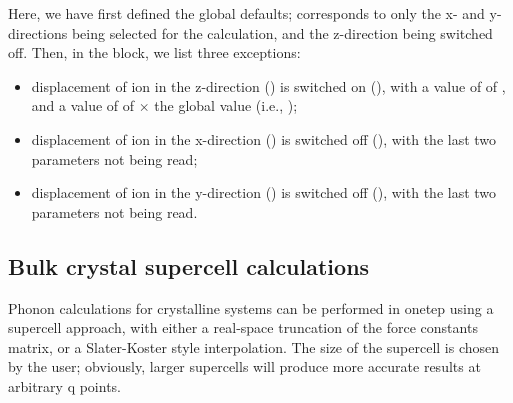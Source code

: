 \documentclass[letterpaper,10pt,english]{sphinxmanual}
\begin{document}
%
\begin{sphinxVerbatim}[commandchars=\\\{\}]
 
 
  

 
    
    
    
 
\end{sphinxVerbatim}

Here, we have first defined the global defaults; 
corresponds to only the x- and y-directions being selected for the
calculation, and the z-direction being switched off. Then, in the
 block, we list three exceptions:
\begin{itemize}
\item {} 
displacement of ion  in the z-direction () is switched on
(), with a value of  of , and a value of
 of  \(\times\) the global value
(i.e., );

\item {} 
displacement of ion  in the x-direction () is switched off
(), with the last two parameters not being read;

\item {} 
displacement of ion  in the y-direction () is switched off
(), with the last two parameters not being read.

\end{itemize}


\subsection{Bulk crystal supercell calculations}
\label{\detokenize{phonons:bulk-crystal-supercell-calculations}}
Phonon calculations for crystalline systems can be performed in onetep
using a supercell approach, with either a real-space truncation of the
force constants matrix, or a Slater-Koster style interpolation. The size
of the supercell is chosen by the user; obviously, larger supercells
will produce more accurate results at arbitrary q points.
\end{document}
